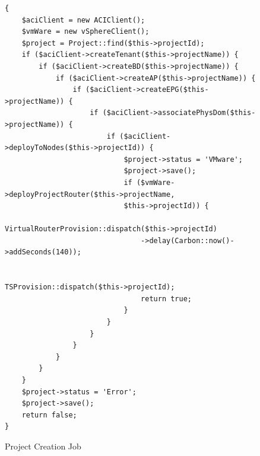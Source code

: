 \begin{figure}[H]
    \begin{lstlisting}[basicstyle=\scriptsize]
{
    $aciClient = new ACIClient();
    $vmWare = new vSphereClient();
    $project = Project::find($this->projectId);
    if ($aciClient->createTenant($this->projectName)) {
        if ($aciClient->createBD($this->projectName)) {
            if ($aciClient->createAP($this->projectName)) {
                if ($aciClient->createEPG($this->projectName)) {
                    if ($aciClient->associatePhysDom($this->projectName)) {
                        if ($aciClient->deployToNodes($this->projectId)) {
                            $project->status = 'VMware';
                            $project->save();
                            if ($vmWare->deployProjectRouter($this->projectName,
                            $this->projectId)) {
                                VirtualRouterProvision::dispatch($this->projectId)
                                ->delay(Carbon::now()->addSeconds(140));

                                TSProvision::dispatch($this->projectId);
                                return true;
                            }
                        }
                    }
                }
            }
        }
    }
    $project->status = 'Error';
    $project->save();
    return false;
}
\end{lstlisting}
    \caption{Project Creation Job}
    \label{fig:project-creation-job}
\end{figure}

